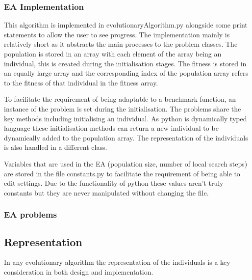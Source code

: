 \documentclass[a4paper]{article}
\begin{document}
\subsubsection{EA Implementation}
\par
This algorithm is implemented in evolutionaryAlgorithm.py alongside some print statements to allow the user to see progress.
The implementation mainly is relatively short as it abstracts the main processes to the problem classes.
The population is stored in an array with each element of the array being an individual, this is created during the initialisation stages.
The fitness is stored in an equally large array and the corresponding index of the population array refers to the fitness of that individual in the fitness array.
\par
To facilitate the requirement of being adaptable to a benchmark function, an instance of the problem is set during the initialisation.
The problems share the key methods including initialising an individual.
As python is dynamically typed language these initialisation methods can return a new individual to be dynamically added to the population array.
The representation of the individuals is also handled in a different class.
\par
Variables that are used in the EA (population size, number of local search steps) are stored in the file constants.py to facilitate the requirement of being able to edit settings.
Due to the functionality of python these values aren't truly constants but they are never manipulated without changing the file.
\subsubsection{EA problems}

\subsection{Representation}
In any evolutionary algorithm the representation of the individuals is a key consideration in both design and implementation.
\end{document}
